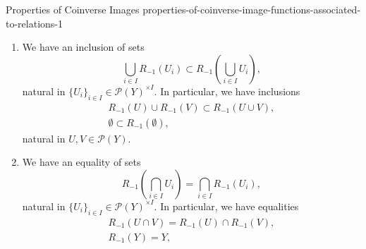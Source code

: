\begin{proposition}{Properties of Coinverse Images \rmI}{properties-of-coinverse-image-functions-associated-to-relations-1}
\begin{enumerate}
\[\begin{tikzcd}[row sep={5.0*\the\DL,between origins}, column sep={12.0*\the\DL,between origins}, background color=backgroundColor, ampersand replacement=\&]
                    {\mathcal{P}(Y)^{\op}\times\mathcal{P}(Y)}
                    \arrow[r,"R^{\op,-1}\times R_{-1}"]
                    \arrow[d,"{[-_{1},-_{2}]_{Y}}"']
                    \&
                    {\mathcal{P}(X)^{\op}\times\mathcal{P}(X)}
                    \arrow[d,"{[-_{1},-_{2}]_{X}}"]
                    \\
                    {\mathcal{P}(Y)}
                    \arrow[r,"R_{-1}"']
                    \&
                    \mathcal{P}(X)
                    \arrow[from=1-2,to=2-1,"\scalebox{1.5}{$\supset$}"{sloped,description},phantom,shorten <= 0.5*\the\DL,shorten >= 0.625*\the\DL,Rightarrow,pos=0.5]%
                \end{tikzcd}
            \]%
            with components
            \[
                [R^{-1}(U),R_{-1}(V)]_{X}%
                \subset%
                R_{-1}([U,V]_{Y}),%
            \]%
            indexed by $U,V\in\mathcal{P}(Y)$.
        \item\label{properties-of-coinverse-image-functions-associated-to-relations-1-lax-preservation-of-colimits}We have an inclusion of sets
            \[
                \bigcup_{i\in I}R_{-1}(U_{i})%
                \subset%
                R_{-1}\left(\bigcup_{i\in I}U_{i}\right),%
            \]%
            natural in $\{U_{i}\}_{i\in I}\in\mathcal{P}(Y)^{\times I}$. In particular, we have inclusions%
            \[
                \begin{gathered}
                    R_{-1}(U)\cup R_{-1}(V) \subset R_{-1}(U\cup V),\\
                    \emptyset               \subset R_{-1}(\emptyset),
                \end{gathered}
            \]%
            natural in $U,V\in\mathcal{P}(Y)$.
        \item\label{properties-of-coinverse-image-functions-associated-to-relations-1-preservation-of-limits}We have an equality of sets
            \[
                    R_{-1}\left(\bigcap_{i\in I}U_{i}\right)%
                    =%
                    \bigcap_{i\in I}R_{-1}(U_{i}),%
            \]%
            natural in $\{U_{i}\}_{i\in I}\in\mathcal{P}(Y)^{\times I}$. In particular, we have equalities%
            \[
                \begin{gathered}
                    R_{-1}(U\cap V) = R_{-1}(U)\cap R_{-1}(V),\\
                    R_{-1}(Y)       = Y,

\end{gathered}\]
\end{enumerate}
\end{proposition}
